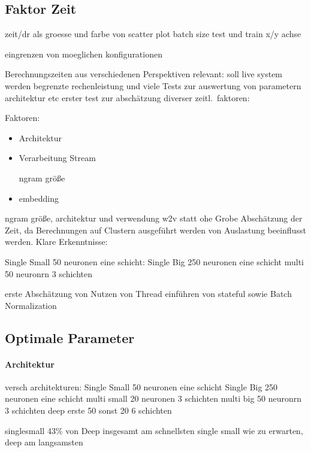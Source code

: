         \subsection{Faktor Zeit}

            zeit/dr als groesse und farbe von scatter plot
            batch size test und train x/y achse

            eingrenzen von moeglichen konfigurationen

            Berechnungszeiten aus verschiedenen Perspektiven relevant:
            soll live system werden
            begrenzte rechenleistung und viele Tests zur auswertung von parametern architektur etc
            erster test zur abschätzung diverser zeitl.\ faktoren:

            Faktoren:
            \begin{itemize}
                \item Architektur
                \item Verarbeitung Stream

                     ngram größe
                \item embedding
            \end{itemize}
        ngram größe, architektur und verwendung w2v statt ohe
        Grobe Abschätzung der Zeit, da Berechnungen auf Clustern ausgeführt werden von Auslastung beeinflusst werden.
        Klare Erkenntnisse:

            Single Small 50 neuronen eine schicht:
            Single Big 250 neuronen eine schicht
            multi 50 neuronrn 3 schichten

        erste Abschätzung von Nutzen von Thread 
        einführen von stateful sowie Batch Normalization

    \subsection{Optimale Parameter}

        \paragraph{Architektur}
            versch architekturen:
            Single Small 50 neuronen eine schicht
            Single Big 250 neuronen eine schicht
            multi small 20 neuronen 3 schichten
            multi big 50 neuronrn 3 schichten
            deep erste 50 sonst 20 6 schichten

            singlesmall 43\% von Deep
            insgesamt am schnellsten single small
            wie zu erwarten,  deep am langsamsten


